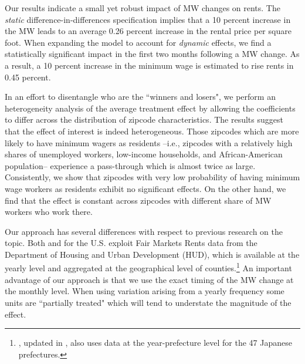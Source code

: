 Our results indicate a small yet robust impact of MW changes on rents. The \textit{static} 
difference-in-differences specification implies that a 10 percent increase in the MW leads to 
an average 0.26 percent increase in the rental price per square foot. When expanding the model 
to account for \textit{dynamic} effects, we find a statistically significant impact in the 
first two months following a MW change. As a result, a 10 percent increase in the minimum 
wage is estimated to rise rents in 0.45 percent. 

In an effort to disentangle who are the ``winners and losers", we perform an heterogeneity 
analysis of the average treatment effect by allowing the coefficients to differ across the 
distribution of zipcode characteristics. The results suggest that the effect of interest is 
indeed heterogeneous. Those zipcodes which are more likely to have minimum wagers as residents 
--i.e., zipcodes with a relatively high shares of unemployed workers, low-income households, 
and African-American population-- experience a pass-through which is almost twice as large. 
Consistently, we show that zipcodes with very low probability of having minimum wage workers 
as residents exhibit no significant effects. On the other hand, we find that the effect is 
constant across zipcodes with different share of MW workers who work there.

Our approach has several differences with respect to previous research on the topic. Both 
\textcite{Tidemann2018} and \textcite{Yamagishi2019} for the U.S. exploit Fair Markets Rents data 
from the Department of Housing and Urban Development (HUD), which is available at the yearly 
level and aggregated at the geographical level of counties.\footnote{\textcite{Yamagishi2019}, 
	updated in \textcite{Yamagishi2020}, also uses data at the year-prefecture level for the 47 
	Japanese prefectures.} 
An important advantage of our approach is that we use the exact timing of the MW change at 
the monthly level. When using variation arising from a yearly frequency some units are 
``partially treated" which will tend to understate the magnitude of the effect. 


